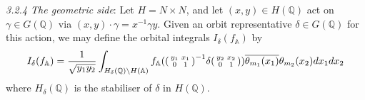 \documentclass{article}
\numberwithin{equation}{section}
\begin{document}
\noindent \emph{3.2.4 The geometric side}: Let $H=N\times N$, and let $(x,y)\in H(\mathbb{Q})$ act on $\gamma \in G(\mathbb{Q})$ via $(x,y)\cdot \gamma = x^{-1}\gamma y$. Given an orbit representative $\delta \in G(\mathbb{Q})$ for this action, we may define the orbital integrals $I_\delta(f_\mathbb{A})$ by
\begin{equation}\label{eq:orbit-geom-integral}
    I_\delta(f_\mathbb{A})=\frac{1}{\sqrt{y_1y_2}}\int_{H_\delta(\mathbb{Q})\backslash H(\mathbb{A})}f_\mathbb{A}(\begin{psmallmatrix}
        y_1 & x_1 \\ 0 & 1
    \end{psmallmatrix}^{-1}\delta\begin{psmallmatrix}
        y_2 & x_2 \\ 0 & 1
    \end{psmallmatrix})\overline{\theta_{m_1}(x_1)}\theta_{m_2}(x_2)dx_1 dx_2
\end{equation}
where $H_\delta(\mathbb{Q})$ is the stabiliser of $\delta$ in $H(\mathbb{Q})$. 
\end{document}
